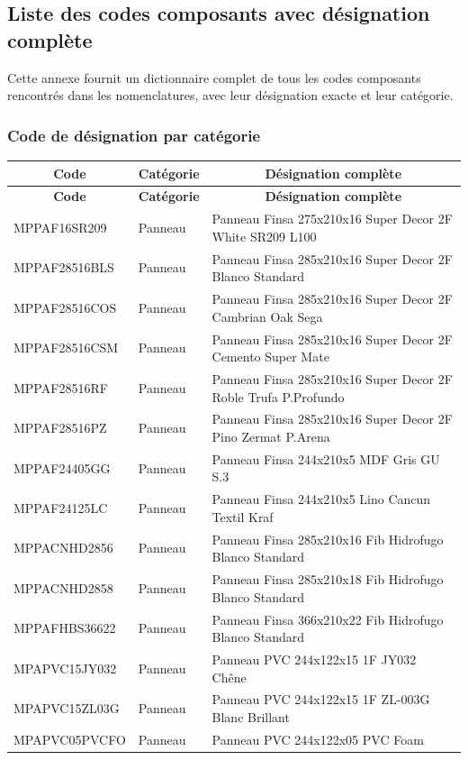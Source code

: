\documentclass[12pt,a4paper]{article}
\begin{document}
\subsection{Liste des codes composants avec désignation complète}

Cette annexe fournit un dictionnaire complet de tous les codes composants rencontrés dans les nomenclatures, avec leur désignation exacte et leur catégorie.

\subsubsection{Code de désignation par catégorie}

\begin{longtable}{|p{3cm}|p{3cm}|p{8cm}|}
\hline
\multicolumn{1}{|c|}{\textbf{Code}} & \multicolumn{1}{c|}{\textbf{Catégorie}} & \multicolumn{1}{c|}{\textbf{Désignation complète}} \\
\hline
\endfirsthead
\hline
\multicolumn{1}{|c|}{\textbf{Code}} & \multicolumn{1}{c|}{\textbf{Catégorie}} & \multicolumn{1}{c|}{\textbf{Désignation complète}} \\
\hline
\endhead
\hline
\endfoot
MPPAF16SR209 & Panneau & Panneau Finsa 275x210x16 Super Decor 2F White SR209 L100 \\
MPPAF28516BLS & Panneau & Panneau Finsa 285x210x16 Super Decor 2F Blanco Standard \\
MPPAF28516COS & Panneau & Panneau Finsa 285x210x16 Super Decor 2F Cambrian Oak Sega \\
MPPAF28516CSM & Panneau & Panneau Finsa 285x210x16 Super Decor 2F Cemento Super Mate \\
MPPAF28516RF & Panneau & Panneau Finsa 285x210x16 Super Decor 2F Roble Trufa P.Profundo \\
MPPAF28516PZ & Panneau & Panneau Finsa 285x210x16 Super Decor 2F Pino Zermat P.Arena \\
MPPAF24405GG & Panneau & Panneau Finsa 244x210x5 MDF Gris GU S.3 \\
MPPAF24125LC & Panneau & Panneau Finsa 244x210x5 Lino Cancun Textil Kraf \\
MPPACNHD2856 & Panneau & Panneau Finsa 285x210x16 Fib Hidrofugo Blanco Standard \\
MPPACNHD2858 & Panneau & Panneau Finsa 285x210x18 Fib Hidrofugo Blanco Standard \\
MPPAFHBS36622 & Panneau & Panneau Finsa 366x210x22 Fib Hidrofugo Blanco Standard \\
MPAPVC15JY032 & Panneau & Panneau PVC 244x122x15 1F JY032 Chêne \\
MPAPVC15ZL03G & Panneau & Panneau PVC 244x122x15 1F ZL-003G Blanc Brillant \\
MPAPVC05PVCFO & Panneau & Panneau PVC 244x122x05 PVC Foam \\
\hline
\end{longtable}
\end{document}

